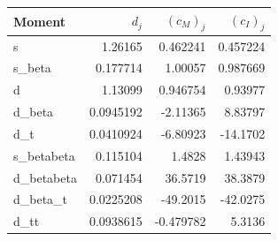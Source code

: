 \begin{tabular}{lrrr}
\toprule
Moment & $d_j$ & $(c_M)_j$ & $(c_I)_j$ \\
\midrule
s & 1.26165 & 0.462241 & 0.457224 \\
s\_beta & 0.177714 & 1.00057 & 0.987669 \\
d & 1.13099 & 0.946754 & 0.93977 \\
d\_beta & 0.0945192 & -2.11365 & 8.83797 \\
d\_t & 0.0410924 & -6.80923 & -14.1702 \\
s\_betabeta & 0.115104 & 1.4828 & 1.43943 \\
d\_betabeta & 0.071454 & 36.5719 & 38.3879 \\
d\_beta\_t & 0.0225208 & -49.2015 & -42.0275 \\
d\_tt & 0.0938615 & -0.479782 & 5.3136 \\
\bottomrule
\end{tabular}
